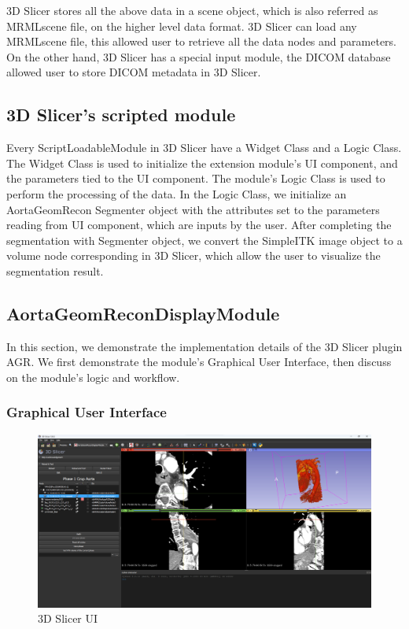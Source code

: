 3D Slicer stores all the above data in a scene object, which is also referred as MRMLscene file, on the higher level data format. 3D Slicer can load any MRMLscene file, this allowed user to retrieve all the data nodes and parameters. On the other hand, 3D Slicer has a special input module, the DICOM database allowed user to store DICOM metadata in 3D Slicer.

\subsection{3D Slicer's scripted module}

Every ScriptLoadableModule in 3D Slicer have a Widget Class and a Logic Class. The Widget Class is used to initialize the extension module's UI component, and the parameters tied to the UI component. The module's Logic Class is used to perform the processing of the data. In the Logic Class, we initialize an AortaGeomRecon Segmenter object with the attributes set to the parameters reading from UI component, which are inputs by the user. After completing the segmentation with Segmenter object, we convert the SimpleITK image object to a volume node corresponding in 3D Slicer, which allow the user to visualize the segmentation result. 

\subsection{AortaGeomReconDisplayModule}

In this section, we demonstrate the implementation details of the 3D Slicer plugin AGR. We first demonstrate the module's Graphical User Interface, then discuss on the module's logic and workflow.

\subsubsection{Graphical User Interface}

\begin{figure}[H]
    \centering
    \includegraphics[width=\textwidth]{figures/AGR/Slicer_UI.png}
    \caption[3D Slicer UI]{3D Slicer UI}
    \label{fig_slicer_ui}
\end{figure}

